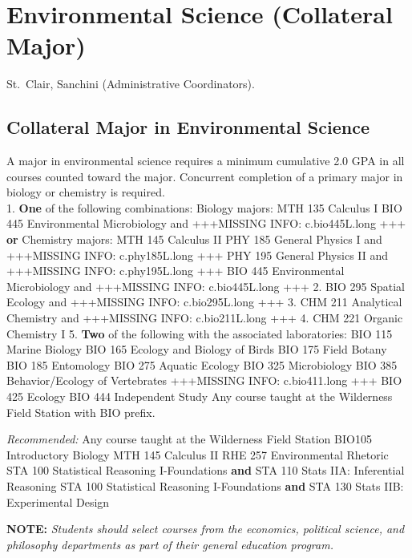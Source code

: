 \documentclass[
  letterpaper,
]{scrbook}
\begin{document}
\hypertarget{sec-environmental-science}{%
\section{Environmental Science (Collateral
Major)}\label{sec-environmental-science}}

St.~Clair, Sanchini (Administrative Coordinators).

\hypertarget{collateral-major-in-environmental-science}{%
\subsection{Collateral Major in Environmental
Science}\label{collateral-major-in-environmental-science}}

A major in environmental science requires a minimum cumulative 2.0 GPA
in all courses counted toward the major. Concurrent completion of a
primary major in biology or chemistry is required.\\
1. \textbf{One} of the following combinations: Biology majors: MTH 135
Calculus I BIO 445 Environmental Microbiology and +++MISSING INFO:
c.bio445L.long +++ \textbf{or} Chemistry majors: MTH 145 Calculus II PHY
185 General Physics I and +++MISSING INFO: c.phy185L.long +++ PHY 195
General Physics II and +++MISSING INFO: c.phy195L.long +++ BIO 445
Environmental Microbiology and +++MISSING INFO: c.bio445L.long +++ 2.
BIO 295 Spatial Ecology and +++MISSING INFO: c.bio295L.long +++ 3. CHM
211 Analytical Chemistry and +++MISSING INFO: c.bio211L.long +++ 4. CHM
221 Organic Chemistry I 5. \textbf{Two} of the following with the
associated laboratories: BIO 115 Marine Biology BIO 165 Ecology and
Biology of Birds BIO 175 Field Botany BIO 185 Entomology BIO 275 Aquatic
Ecology BIO 325 Microbiology BIO 385 Behavior/Ecology of Vertebrates
+++MISSING INFO: c.bio411.long +++ BIO 425 Ecology BIO 444 Independent
Study Any course taught at the Wilderness Field Station with BIO prefix.

\emph{Recommended:} Any course taught at the Wilderness Field Station
BIO105 Introductory Biology MTH 145 Calculus II RHE 257 Environmental
Rhetoric STA 100 Statistical Reasoning I-Foundations \textbf{and} STA
110 Stats IIA: Inferential Reasoning STA 100 Statistical Reasoning
I-Foundations \textbf{and} STA 130 Stats IIB: Experimental Design

\textbf{NOTE:} \emph{Students should select courses from the economics,
political science, and philosophy departments as part of their general
education program.}
\end{document}
